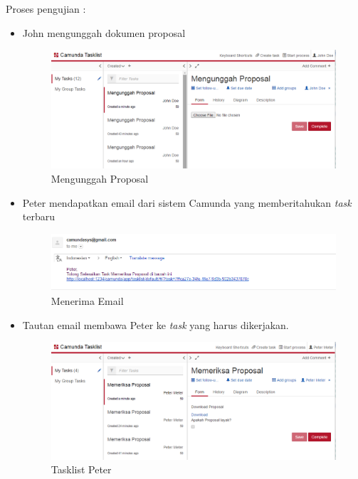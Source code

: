 Proses pengujian :
\begin{itemize}
	\item John mengunggah dokumen proposal
				\begin{figure}[H]
			\centering
			\includegraphics[scale=0.5]{Gambar/Bab-5/uji1-1}
			\caption{Mengunggah Proposal} 
			\label{fig:unggahProposal}
		\end{figure}
	\item Peter mendapatkan email dari sistem Camunda yang memberitahukan \textit{task} terbaru
	\begin{figure}[H]
			\centering
			\includegraphics[scale=0.5]{Gambar/Bab-5/uji1-2}
			\caption{Menerima Email} 
			\label{fig:menerimaEmail}
		\end{figure}
	\item Tautan email membawa Peter ke \textit{task} yang harus dikerjakan.
		\begin{figure}[H]
			\centering
			\includegraphics[scale=0.5]{Gambar/Bab-5/uji1-3}
			\caption{Tasklist Peter} 
			\label{fig:tasklistPeter}
		\end{figure}
	\end{itemize}
	

